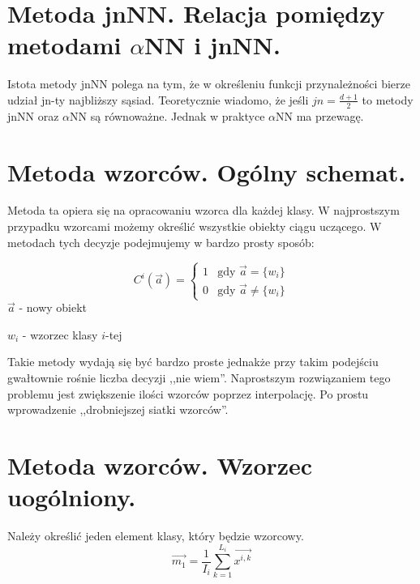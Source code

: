 \documentclass[a4paper,10pt]{article}
\begin{document}
\section{Metoda jnNN. Relacja pomiędzy metodami $\alpha$NN i jnNN.}
Istota metody jnNN polega na tym, że w określeniu funkcji przynależności bierze udział jn-ty najbliższy sąsiad. Teoretycznie wiadomo, że jeśli $jn=\frac{d+1}{2}$ to metody jnNN oraz $\alpha$NN są równoważne. Jednak w praktyce $\alpha$NN ma przewagę.

\section{Metoda wzorców. Ogólny schemat.}
Metoda ta opiera się na opracowaniu wzorca dla każdej klasy. W najprostszym przypadku wzorcami możemy określić wszystkie obiekty ciągu uczącego. W metodach tych decyzje podejmujemy w bardzo prosty sposób:

\begin{equation}
 C^i(\overrightarrow{a}) = 
\begin{cases} 1 & \mbox{gdy }\overrightarrow{a} = \{w_i\}\\
 0 & \mbox{gdy }\overrightarrow{a} \neq \{w_i\}
\end{cases}
\end{equation}
$\overrightarrow{a}$ - nowy obiekt

$w_i$ - wzorzec klasy $i$-tej

Takie metody wydają się być bardzo proste jednakże przy takim podejściu gwałtownie rośnie liczba decyzji ,,nie wiem''.
Naprostszym rozwiązaniem tego problemu jest zwiększenie ilości wzorców poprzez interpolację. Po prostu wprowadzenie ,,drobniejszej siatki wzorców''.

\section{Metoda wzorców. Wzorzec uogólniony.}
Należy określić jeden element klasy, który będzie wzorcowy. 
\begin{equation}
  \overrightarrow{m_1} = \frac{1}{I_i} \sum_{k=1}^{L_i} \overrightarrow{x^{i,k}}
\end{equation}
\end{document}
